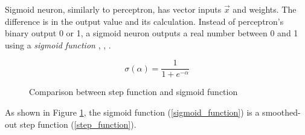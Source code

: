 Sigmoid neuron, similarly to perceptron, has vector inputs $\vec{x}$ and weights. The difference is in the output value and its calculation. Instead of perceptron's binary output 0 or 1, a sigmoid neuron outputs a real number between 0 and 1 using a \textit{sigmoid function} \cite{nndl2015michaelnielsen}, \cite{rojas2013neural}, \cite{matous}.

\begin{equation}
    {\sigma(\alpha) = \frac{1}{1 + e^{-\alpha}}}
\end{equation}

\begin{figure}[h]
	\centering
    \qquad
    \caption{Comparison between step function and sigmoid function}
    \label{sigmoid_neuron}
\end{figure}
As shown in Figure \ref{sigmoid_neuron}, the sigmoid function (\ref{sigmoid_function}) is a smoothed-out  step function (\ref{step_function}).
